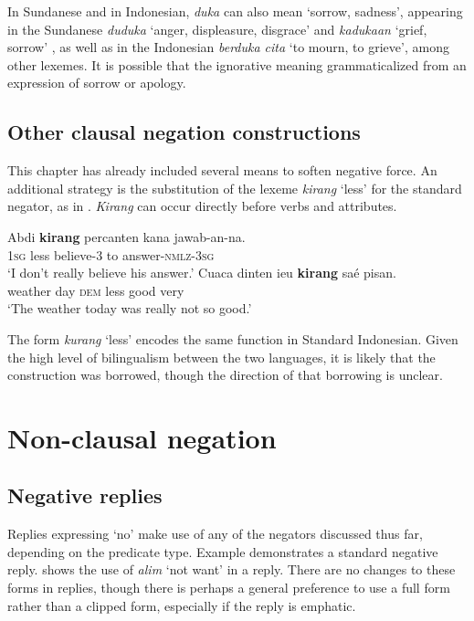 \documentclass[output=paper]{langscibook}
\begin{document}
In Sundanese and in Indonesian, \textit{duka} can also mean ‘sorrow, sadness’, appearing in the Sundanese \textit{duduka} ‘anger, displeasure, disgrace’ and \textit{kadukaan} ‘grief, sorrow’ \citep[210]{Hardjadibrata2003}, as well as in the Indonesian \textit{berduka cita} ‘to mourn, to grieve’, among other lexemes. It is possible that the ignorative meaning grammaticalized from an expression of sorrow or apology. 

\subsection{Other clausal negation constructions}\label{sec:sun:2.6}

This chapter has already included several means to soften negative force. An additional strategy is the substitution of the lexeme \textit{kirang} ‘less’ for the standard negator, as in . \textit{Kirang} can occur directly before verbs and attributes. 

\ea\label{ex:sun:34}
    \ea\label{ex:sun:34a}
        \gll  Abdi \textbf{kirang} percanten kana jawab-an-na. \\ 
              1\textsc{sg} less believe-3 to answer-\textsc{nmlz}-3\textsc{sg}\\
        \glt ‘I don’t really believe his answer.’
    \ex\label{ex:sun:34b}
        \gll  Cuaca dinten ieu \textbf{kirang} saé pisan.\\
              weather day \textsc{dem} less good very\\
        \glt ‘The weather today was really not so good.’ \citep[83]{Butters2021}
    \z
\z 

The form \textit{kurang} ‘less’ encodes the same function in Standard Indonesian. Given the high level of bilingualism between the two languages, it is likely that the construction was borrowed, though the direction of that borrowing is unclear. 

\section{Non-clausal negation}\label{sec:sun:3}

\subsection{Negative replies}\label{sec:sun:3.1}

Replies expressing ‘no’ make use of any of the negators discussed thus far, depending on the predicate type. Example  demonstrates a standard negative reply.  shows the use of \textit{alim} ‘not want’ in a reply. There are no changes to these forms in replies, though there is perhaps a general preference to use a full form rather than a clipped form, especially if the reply is emphatic.
\end{document}
